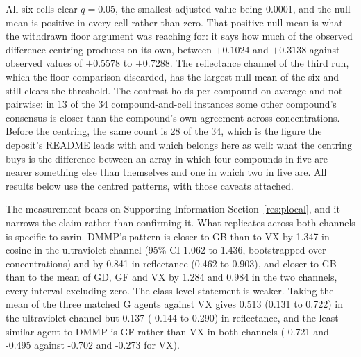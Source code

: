 \documentclass[11pt,a4paper]{article}
\begin{document}
All six cells clear $q = 0.05$, the smallest adjusted value being 0.0001, and
the null mean is positive in every cell rather than zero. That positive null
mean is what the withdrawn floor argument was reaching for: it says how much of
the observed difference centring produces on its own, between $+0.1024$ and
$+0.3138$ against observed values of $+0.5578$ to $+0.7288$. The reflectance
channel of the third run, which the floor comparison discarded, has the largest
null mean of the six and still clears the threshold. The contrast holds per
compound on average and not pairwise: in 13 of the 34 compound-and-cell
instances some
other compound's consensus is closer than the compound's own agreement across
concentrations. Before the centring, the same count is 28 of the 34, which is
the figure the deposit's README leads with and which belongs here as well: what
the centring buys is the difference between an array in which four compounds in
five are nearer something else than themselves and one in which two in five
are. All results below use the centred patterns, with those caveats
attached.


The measurement bears on Supporting Information Section~\ref{res:plocal}, and it narrows the claim
rather than confirming it. What replicates across both channels is specific to
sarin. DMMP's pattern is closer to GB than to VX by 1.347 in cosine in the
ultraviolet channel (95\% CI 1.062 to 1.436, bootstrapped over concentrations)
and by 0.841 in reflectance (0.462 to 0.903), and closer to GB than to the mean
of GD, GF and VX by 1.284 and 0.984 in the two channels, every interval
excluding zero. The class-level statement is weaker. Taking the mean of the
three matched G agents against VX gives 0.513 (0.131 to 0.722) in the
ultraviolet channel but 0.137 (-0.144 to 0.290) in reflectance, and the least
similar agent to DMMP is GF rather than VX in both channels (-0.721 and -0.495
against -0.702 and -0.273 for VX).
\end{document}
